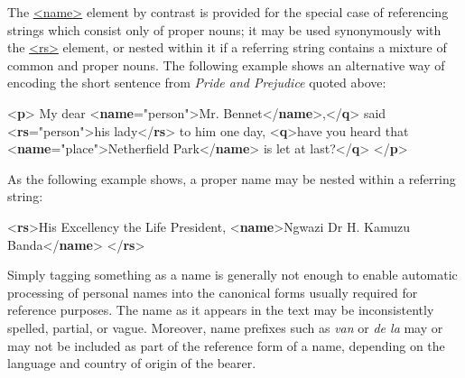 The \hyperref[TEI.name]{<name>} element by contrast is provided for the special case of referencing strings which consist only of proper nouns; it may be used synonymously with the \hyperref[TEI.rs]{<rs>} element, or nested within it if a referring string contains a mixture of common and proper nouns. The following example shows an alternative way of encoding the short sentence from \textit{Pride and Prejudice} quoted above: \par\bgroup{}\exampleFont \begin{shaded}\noindent\mbox{}{<\textbf{p}>}\mbox{}\newline 
{}My dear {<\textbf{name}\hspace*{1em}{type}="{person}">}Mr. Bennet{</\textbf{name}>},{</\textbf{q}>} said {<\textbf{rs}\hspace*{1em}{type}="{person}">}his lady{</\textbf{rs}>} to him one day,\mbox{}\newline 
{<\textbf{q}>}have you heard that {<\textbf{name}\hspace*{1em}{type}="{place}">}Netherfield Park{</\textbf{name}>} is let at last?{</\textbf{q}>}\mbox{}\newline 
{</\textbf{p}>}\end{shaded}\egroup\par \noindent  As the following example shows, a proper name may be nested within a referring string: \par\bgroup{}\exampleFont \begin{shaded}\noindent\mbox{}{<\textbf{rs}>}His Excellency the Life President, {<\textbf{name}>}Ngwazi Dr H. Kamuzu Banda{</\textbf{name}>}\mbox{}\newline 
{</\textbf{rs}>}\end{shaded}\egroup\par \par
Simply tagging something as a name is generally not enough to enable automatic processing of personal names into the canonical forms usually required for reference purposes. The name as it appears in the text may be inconsistently spelled, partial, or vague. Moreover, name prefixes such as \textit{van} or \textit{de la} may or may not be included as part of the reference form of a name, depending on the language and country of origin of the bearer.\par
